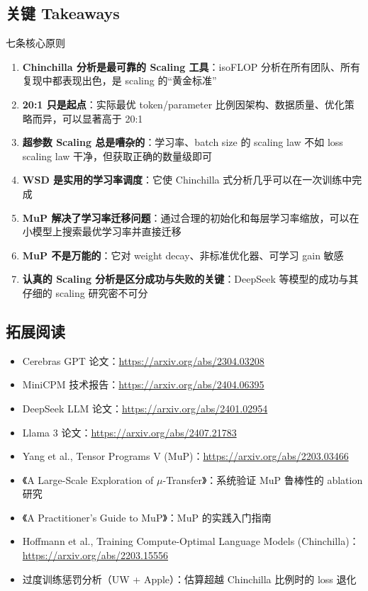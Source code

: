 \subsection{关键 Takeaways}

\begin{importantbox}{七条核心原则}
\begin{enumerate}
    \item \textbf{Chinchilla 分析是最可靠的 Scaling 工具}：isoFLOP 分析在所有团队、所有复现中都表现出色，是 scaling 的``黄金标准''
    \item \textbf{20:1 只是起点}：实际最优 token/parameter 比例因架构、数据质量、优化策略而异，可以显著高于 20:1
    \item \textbf{超参数 Scaling 总是嘈杂的}：学习率、batch size 的 scaling law 不如 loss scaling law 干净，但获取正确的数量级即可
    \item \textbf{WSD 是实用的学习率调度}：它使 Chinchilla 式分析几乎可以在一次训练中完成
    \item \textbf{MuP 解决了学习率迁移问题}：通过合理的初始化和每层学习率缩放，可以在小模型上搜索最优学习率并直接迁移
    \item \textbf{MuP 不是万能的}：它对 weight decay、非标准优化器、可学习 gain 敏感
    \item \textbf{认真的 Scaling 分析是区分成功与失败的关键}：DeepSeek 等模型的成功与其仔细的 scaling 研究密不可分
\end{enumerate}
\end{importantbox}

\subsection{拓展阅读}

\begin{itemize}
    \item Cerebras GPT 论文：\url{https://arxiv.org/abs/2304.03208}
    \item MiniCPM 技术报告：\url{https://arxiv.org/abs/2404.06395}
    \item DeepSeek LLM 论文：\url{https://arxiv.org/abs/2401.02954}
    \item Llama 3 论文：\url{https://arxiv.org/abs/2407.21783}
    \item Yang et al., Tensor Programs V (MuP)：\url{https://arxiv.org/abs/2203.03466}
    \item 《A Large-Scale Exploration of $\mu$-Transfer》：系统验证 MuP 鲁棒性的 ablation 研究
    \item 《A Practitioner's Guide to MuP》：MuP 的实践入门指南
    \item Hoffmann et al., Training Compute-Optimal Language Models (Chinchilla)：\url{https://arxiv.org/abs/2203.15556}
    \item 过度训练惩罚分析（UW + Apple）：估算超越 Chinchilla 比例时的 loss 退化
\end{itemize}


